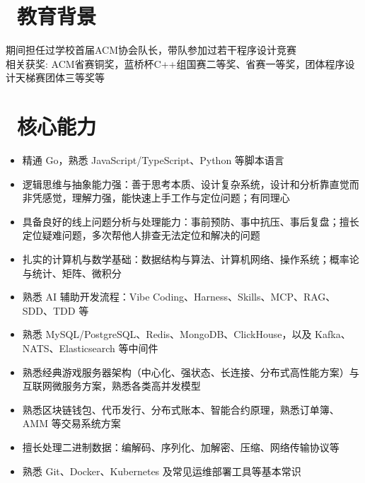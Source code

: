 \documentclass{resume}
\begin{document}



\section{\faGraduationCap\ 教育背景}
期间担任过学校首届ACM协会队长，带队参加过若干程序设计竞赛
\\相关获奖: ACM省赛铜奖，蓝桥杯C++组国赛二等奖、省赛一等奖，团体程序设计天梯赛团体三等奖等

\section{\faStar\ 核心能力}
\begin{itemize}[parsep=0.5ex]
  \item 精通 Go，熟悉 JavaScript/TypeScript、Python 等脚本语言
  \item 逻辑思维与抽象能力强：善于思考本质、设计复杂系统，设计和分析靠直觉而非凭感觉，理解力强，能快速上手工作与定位问题；有同理心
  \item 具备良好的线上问题分析与处理能力：事前预防、事中抗压、事后复盘；擅长定位疑难问题，多次帮他人排查无法定位和解决的问题
  \item 扎实的计算机与数学基础：数据结构与算法、计算机网络、操作系统；概率论与统计、矩阵、微积分
  \item 熟悉 AI 辅助开发流程：Vibe Coding、Harness、Skills、MCP、RAG、SDD、TDD 等
  \item 熟悉 MySQL/PostgreSQL、Redis、MongoDB、ClickHouse，以及 Kafka、NATS、Elasticsearch 等中间件
  \item 熟悉经典游戏服务器架构（中心化、强状态、长连接、分布式高性能方案）与互联网微服务方案，熟悉各类高并发模型
  \item 熟悉区块链钱包、代币发行、分布式账本、智能合约原理，熟悉订单簿、AMM 等交易系统方案
  \item 擅长处理二进制数据：编解码、序列化、加解密、压缩、网络传输协议等
  \item 熟悉 Git、Docker、Kubernetes 及常见运维部署工具等基本常识
\end{itemize}
\end{document}
